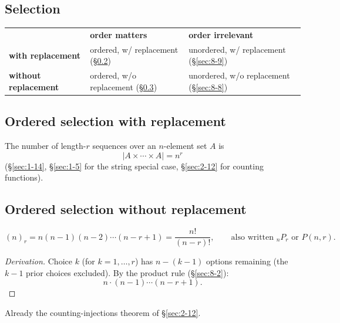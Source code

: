 \subsection{Selection}
\label{sec:8-5}

\begin{note}
\begin{center}
\begin{tabular}{lll}
 & \textbf{order matters} & \textbf{order irrelevant} \\
\textbf{with replacement} & ordered, w/ replacement (\S\ref{sec:8-6}) & unordered, w/ replacement (\S\ref{sec:8-9}) \\
\textbf{without replacement} & ordered, w/o replacement (\S\ref{sec:8-7}) & unordered, w/o replacement (\S\ref{sec:8-8})
\end{tabular}
\end{center}
\end{note}

\subsection{Ordered selection with replacement}
\label{sec:8-6}

\begin{proposition}
The number of length-$r$ sequences over an $n$-element set $A$ is
\[
|A\times\cdots\times A| = n^r
\]
(\S\ref{sec:1-14}, \S\ref{sec:1-5} for the string special case, \S\ref{sec:2-12} for counting functions).
\end{proposition}

\subsection{Ordered selection without replacement}
\label{sec:8-7}

\begin{definition}
\[
(n)_r = n(n-1)(n-2)\cdots(n-r+1) = \frac{n!}{(n-r)!}, \qquad \text{also written } {}_nP_r \text{ or } P(n,r).
\]
\end{definition}
\begin{proof}[Derivation]
Choice $k$ (for $k=1,\dots,r$) has $n-(k-1)$ options remaining (the $k-1$ prior choices excluded). By the product rule (\S\ref{sec:8-2}):
\[
n\cdot(n-1)\cdots(n-r+1).
\]
\end{proof}

\begin{note}
Already the counting-injections theorem of \S\ref{sec:2-12}.
\end{note}

